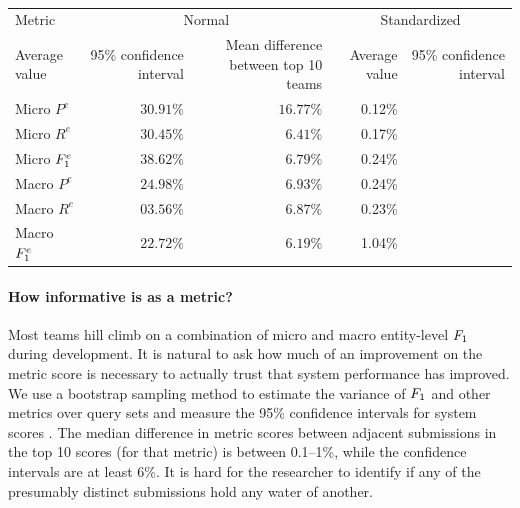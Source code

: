\begin{table}
  \begin{tabular} {l r r r r} \toprule
    Metric & \multicolumn{2}{c}{Normal} & \multicolumn{2}{c}{Standardized} \\
              Average value & 95\% confidence interval & Mean difference between top 10 teams &  Average value & 95\% confidence interval  \\  \midrule 
Micro $P^e$     & $30.91\%$ &  $16.77\%$ & 0.12\% &     &  \\
Micro $R^e$     & $30.45\%$ &  $ 6.41\%$ & 0.17\% &     &  \\
Micro $F_1^e$ & $38.62\%$ &  $ 6.79\%$ & 0.24\% &     &  \\
Macro $P^e$     & $24.98\%$ &  $ 6.93\%$ & 0.24\% &     &  \\
Macro $R^e$     & $03.56\%$ &  $ 6.87\%$ & 0.23\% &     &  \\
Macro $F_1^e$ & $22.72\%$ &  $ 6.19\%$ & 1.04\% &     &  \\ \bottomrule
  \end{tabular}






  \caption{\label{metric-variance}}
\end{table}

\paragraph{How informative is \fone{} as a metric?}
Most teams hill climb on a combination of micro and macro entity-level $F_1$ during development.
It is natural to ask how much of an improvement on the metric score is necessary to actually trust that system performance has improved.
We use a bootstrap sampling method to estimate the variance of $F_1$ and other metrics over query sets  and measure the 95\% confidence intervals for system scores .
The median difference in metric scores between adjacent submissions in the top 10 scores (for that metric) is between 0.1--1\%,
while the confidence intervals are at least 6\%.
It is hard for the researcher to identify if any of the presumably distinct submissions hold any water of another.

